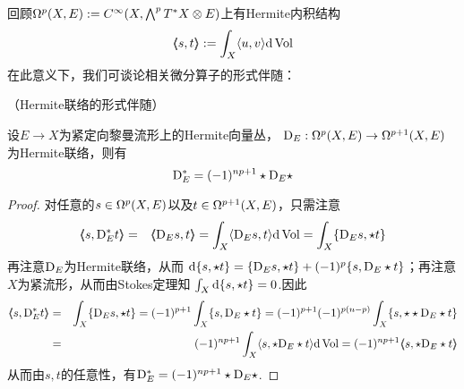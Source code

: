 回顾$\Omega^p(X,E):=C^\infty(X,\bigwedge\nolimits^{p}T^*X\otimes E)$上有Hermite内积结构
$$\langle\!\! \langle s,t \rangle\!\! \rangle:=\int_X\langle u,v \rangle\mathrm{d}\operatorname{Vol}$$
在此意义下，我们可谈论相关微分算子的形式伴随：


\begin{prop}（Hermite联络的形式伴随）
\label{Hermite联络的形式伴随-prop}

设$E\to X$为紧定向黎曼流形上的Hermite向量丛，
$\mathrm{D}_E:\Omega^p(X,E)\to\Omega^{p+1}(X,E)$为Hermite联络，则有
$$\mathrm{D}_E^*=(-1)^{np+1}\star\mathrm{D}_E\star$$
\end{prop}

\begin{proof}
对任意的$s\in\Omega^p(X,E)$以及$t\in\Omega^{p+1}(X,E)$，只需注意
\begin{eqnarray*}
     \ppair{s}{\tD_E^*t}
&=&
     \ppair{\tD_Es}{t}
 =
     \int_X\pair{\tD_Es}{t}\td\Vol
 =
     \int_X
       \bair{\tD_Es}{\star t}
\end{eqnarray*}
再注意$\mathrm{D}_E$为Hermite联络，从而
$
  \mathrm{d}\{ s,\star t \}
= \{ \mathrm{D}_Es,\star t \}+(-1)^p\{ s,\mathrm{D}_E\star t \}
$；再注意$X$为紧流形，从而由Stokes定理知
$\int_X\mathrm{d}\{ s,\star t \}=0$.因此
\begin{eqnarray*}
  \ppair{s}{\tD_E^*t}
&=&
  \int_X\bair{\tD_Es}{\star t}
=
  (-1)^{p+1}\int_X
    \bair{s}{\tD_E\star t}
=
  (-1)^{p+1}(-1)^{p(n-p)}\int_X
    \bair{s}{\star\star\tD_E\star t}\\
&=&
  (-1)^{np+1}\int_X
    \pair{s}{\star\tD_E\star t}\td\Vol
=
  (-1)^{np+1}\ppair{s}{\star\tD_E\star t}
\end{eqnarray*}
从而由$s,t$的任意性，有$\mathrm{D}_E^*=(-1)^{np+1}\star\mathrm{D}_E\star$.
\end{proof}

